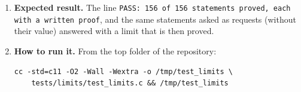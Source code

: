 \documentclass[11pt,a4paper]{article}
\begin{document}
\begin{enumerate}
\item \textbf{Expected result.} The line \texttt{PASS: 156 of 156 statements proved, each with a written proof}, and the same statements asked as requests (without their value) answered with a limit that is then proved.

\item \textbf{How to run it.} From the top folder of the repository:
\begin{verbatim}
cc -std=c11 -O2 -Wall -Wextra -o /tmp/test_limits \
    tests/limits/test_limits.c && /tmp/test_limits
\end{verbatim}
\end{enumerate}
\end{document}
